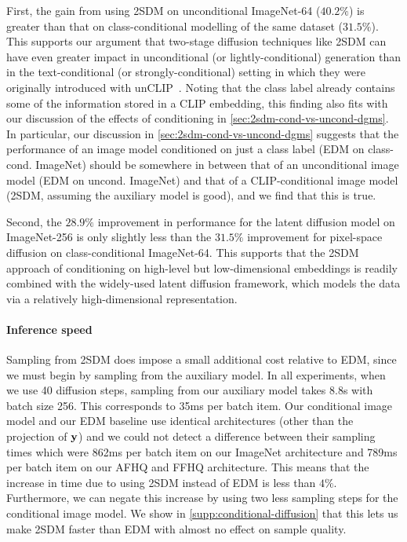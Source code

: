 First, the gain from using 2SDM on unconditional ImageNet-64 ($40.2\%$) is greater than that on class-conditional modelling of the same dataset ($31.5\%$). This supports our argument that two-stage diffusion techniques like 2SDM can have even greater impact in unconditional (or lightly-conditional) generation than in the text-conditional (or strongly-conditional) setting in which they were originally introduced with unCLIP~\citep{ramesh2022hierarchical}.  Noting that the class label already contains some of the information stored in a CLIP embedding, this finding also fits with our discussion of the effects of conditioning in \cref{sec:2sdm-cond-vs-uncond-dgms}. In particular, our discussion in \cref{sec:2sdm-cond-vs-uncond-dgms} suggests that the performance of an image model conditioned on just a class label (EDM on class-cond. ImageNet) should be somewhere in between that of an unconditional image model (EDM on uncond. ImageNet) and that of a CLIP-conditional image model (2SDM, assuming the auxiliary model is good), and we find that this is true.

Second, the $28.9\%$ improvement in performance for the latent diffusion model on ImageNet-256 is only slightly less than the $31.5\%$ improvement for pixel-space diffusion on class-conditional ImageNet-64. This supports that the 2SDM approach of conditioning on high-level but low-dimensional embeddings is readily combined with the widely-used latent diffusion framework, which models the data via a relatively high-dimensional representation.

\paragraph{Inference speed}
Sampling from 2SDM does impose a small additional cost relative to EDM, since we must begin by sampling from the auxiliary model. In all experiments, when we use 40 diffusion steps, sampling from our auxiliary model takes 8.8s with batch size 256. This corresponds to 35ms per batch item. Our conditional image model and our EDM baseline use identical architectures (other than the projection of ${\mathbf{y}}$) and we could not detect a difference between their sampling times which were 862ms per batch item on our ImageNet architecture and 789ms per batch item on our AFHQ and FFHQ architecture. This means that the increase in time due to using 2SDM instead of EDM is less than $4\%$. Furthermore, we can negate this increase by using two less sampling steps for the conditional image model. We show in \cref{supp:conditional-diffusion} that this lets us make 2SDM faster than EDM with almost no effect on sample quality.


